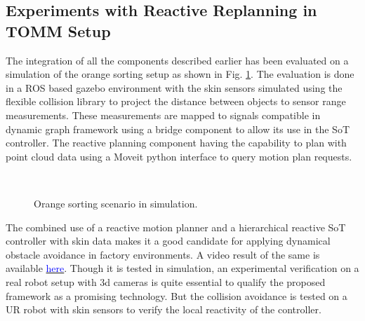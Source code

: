 \subsection{Experiments with Reactive Replanning in TOMM Setup}
\hypersetup{colorlinks, linkcolor=blue}
The integration of all the components described earlier has been evaluated on a simulation of the orange sorting setup as shown in Fig. \ref{fig:TOMMSimulation}. The evaluation is done in a ROS based gazebo environment with the skin sensors simulated using the flexible collision library to project the distance between objects to sensor range measurements. These measurements are mapped to signals compatible in dynamic graph framework using a bridge component to allow its use in the SoT controller. The reactive planning component having the capability to plan with point cloud data using a Moveit python interface to query motion plan requests. 
\begin{figure}[ht]
\centering
{}\\[-10pt]
\caption[]{Orange sorting scenario in simulation.}
\label{fig:TOMMSimulation}
\end{figure}
The combined use of a reactive motion planner and a hierarchical reactive SoT controller with skin data makes it a good candidate for applying dynamical obstacle avoidance in factory environments. A video result of the same is available \href{https://youtu.be/uLStjR7mpOI}{\textcolor{blue}{here}}. Though it is tested in simulation, an experimental verification on a real robot setup with 3d cameras is quite essential to qualify the proposed framework as a promising technology. But the collision avoidance is tested on a UR robot with skin sensors to verify the local reactivity of the controller. 

